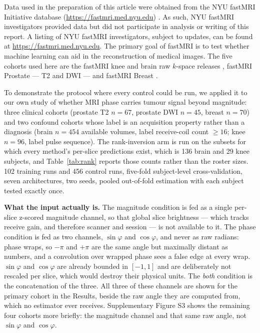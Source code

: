 \documentclass[11pt,a4paper]{article}
\begin{document}
Data used in the preparation of this article were obtained from the NYU fastMRI
Initiative database (\url{https://fastmri.med.nyu.edu})
\citep{knoll2020fastmri,zbontar2018fastmri}. As such, NYU fastMRI investigators
provided data but did not participate in analysis or writing of this report. A
listing of NYU fastMRI investigators, subject to updates, can be found at
\url{https://fastmri.med.nyu.edu}. The primary goal of fastMRI is to test whether
machine learning can aid in the reconstruction of medical images. The five
cohorts used here are the fastMRI knee and brain raw $k$-space releases
\citep{knoll2020fastmri,zbontar2018fastmri}, fastMRI Prostate --- T2 and DWI
\citep{tibrewala2023fastmriprostate} --- and fastMRI Breast
\citep{solomon2025fastmribreast}.

To demonstrate the protocol where every control could be run, we applied it to
our own study of whether MRI phase carries tumour signal beyond magnitude: three
clinical cohorts (prostate T2 $n=67$, prostate DWI $n=45$, breast $n=70$) and
two confound cohorts whose label is an acquisition property rather than a
diagnosis (brain $n=454$ available volumes, label receive-coil count $\geq 16$;
knee $n=96$, label pulse sequence). The rank-inversion arm is run on the subsets for
which every method's per-slice predictions exist, which is 136 brain and 29 knee
subjects, and Table~\ref{tab:rank} reports those counts rather than the roster
sizes. 102 training runs and 456 control runs, five-fold subject-level
cross-validation, seven architectures, two seeds, pooled out-of-fold estimation
with each subject tested exactly once.

\textbf{What the input actually is.} The magnitude condition is fed as a single
per-slice z-scored magnitude channel, so that global slice brightness --- which
tracks receive gain, and therefore scanner and session --- is not available to it.
The phase
condition is fed as two channels, $\sin\varphi$ and $\cos\varphi$, and never as
raw radians: phase wraps, so $-\pi$ and $+\pi$ are the same angle but maximally
distant as numbers, and a convolution over wrapped phase sees a false edge at
every wrap. $\sin\varphi$ and $\cos\varphi$ are already bounded in $[-1,1]$ and
are deliberately not rescaled per slice, which would destroy their physical
units. The \emph{both} condition is the concatenation of the three. All three of
these channels are shown for the primary cohort in the Results, beside the raw
angle they are computed from, which no estimator ever receives. Supplementary
Figure S3 shows the remaining four cohorts more briefly: the magnitude channel
and that same raw angle, not $\sin\varphi$ and $\cos\varphi$.
\end{document}
